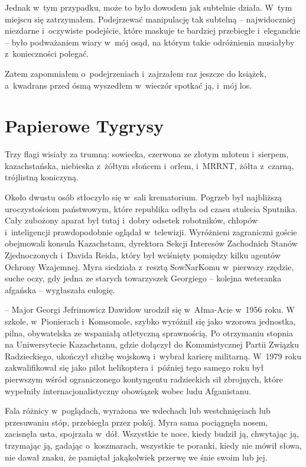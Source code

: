 \documentclass[oneside,polish,11pt,sfheadings]{mwbk}
\let\footnote=\endnote
\begin{document}
Jednak w~tym przypadku, może to było dowodem jak subtelnie działa. W~tym
miejscu się zatrzymałem. Podejrzewać manipulację tak subtelną -- najwidoczniej niezdarne i~oczywiste podejście, które maskuje te bardziej
przebiegłe i~eleganckie -- było podważaniem wiary w~mój osąd, na którym
takie odróżnienia musiałyby z~konieczności polegać.

Zatem zapomniałem o~podejrzeniach i~zajrzałem raz jeszcze do książek, a~kwadrans przed ósmą wyszedłem w~wieczór spotkać ją, i~mój los.


\chapter{Papierowe Tygrysy}

Trzy flagi wisiały za trumną: sowiecka, czerwona ze złotym młotem i~sierpem, kazachstańska, niebieska z~żółtym słońcem i~orłem, i~MRRNT,
żółta z~czarną, trójlistną koniczyną.

Około dwustu osób stłoczyło się w~sali krematorium. Pogrzeb był
najbliższą uroczystościom państwowym, które republika odbyła od czasu
stulecia Sputnika. Cały zubożony aparat był tutaj i~dobry odsetek
robotników, chłopów i~inteligencji prawdopodobnie oglądał w~telewizji.
Wyróżnieni zagraniczni goście obejmowali konsula Kazachstanu, dyrektora
Sekcji Interesów Zachodnich Stanów Zjednoczonych i~Davida Reida, który
był wciśnięty pomiędzy kilku agentów Ochrony Wzajemnej. Myra siedziała z~resztą SowNarKomu w~pierwszy rzędzie, suche oczy, gdy jedna ze starych
towarzyszek Georgiego -- kolejna weteranka afgańska -- wygłaszała
eulogię\footnote{ mowa pogrzebowa -- przyp.tłum.}.

-- Major Georgi Jefrimowicz Dawidow urodził się w~Ałma-Acie w~1956 roku.
W szkole, w~Pionierach i~Komsomole, szybko wyróżnił się jako wzorowa
jednostka, pilna, obywatelska ze wspaniałą atletyczną sprawnością. Po
otrzymaniu stopnia na Uniwersytecie Kazachstanu, gdzie dołączył do
Komunistycznej Partii Związku Radzieckiego, ukończył służbę wojskową i~wybrał karierę militarną. W~1979 roku zakwalifikował się jako pilot
helikoptera i~później tego samego roku był pierwszym wśród ograniczonego
kontyngentu radzieckich sił zbrojnych, które wypełniły
internacjonalistyczny obowiązek wobec ludu Afganistanu.

Fala różnicy w~poglądach, wyrażona we wdechach lub westchnięciach lub
przesuwaniu stóp, przebiegła przez pokój. Myra sama pociągnęła nosem,
zacisnęła usta, spojrzała w~dół. Wszystkie te noce, kiedy budził ją,
chwytając ją, trzymając ją, gadając o~koszmarach, wszystkie te poranki,
kiedy nie mówił słowa, nie dawał znaku, że pamiętał jakąkolwiek przerwę
we śnie swoim lub jej.
\end{document}
